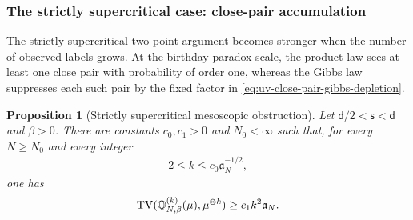 \documentclass[11pt,reqno]{amsart}
\numberwithin{equation}{section}
\theoremstyle{plain}
\newtheorem{prop}[prop]{Proposition}
\theoremstyle{remark}
\DeclarePairedDelimiter{\pa}{\lparen}{\rparen}
\renewcommand{\d}{\mathsf{d}}
\newcommand{\Q}{{\mathbb{Q}}}
\newcommand{\be}{\beta}
\newcommand{\s}{\mathsf{s}}
\newcommand{\TV}{\operatorname{TV}}
\begin{document}
\subsubsection{The strictly supercritical case: close-pair accumulation}
\label{subsubsec:uv-supercritical-mesoscopic}

The strictly supercritical two-point argument becomes stronger when the number of observed labels grows.  At the birthday-paradox scale, the product law sees at least one close pair with probability of order one, whereas the Gibbs law suppresses each such pair by the fixed factor in \eqref{eq:uv-close-pair-gibbs-depletion}.

\begin{prop}[Strictly supercritical mesoscopic obstruction]
\label{prop:uv-mesoscopic-close-pair}
Let \(\d/2<\s<\d\) and \(\be>0\).  There are constants \(c_0,c_1>0\) and \(N_0<\infty\) such that, for every \(N\ge N_0\) and every integer
\begin{align}\label{eq:uv-mesoscopic-supercritical-k-range}
 2\le k\le c_0\mathfrak a_N^{-1/2},
\end{align}
one has
\begin{align}\label{eq:uv-mesoscopic-supercritical-TV-lower}
 \TV\pa{\Q_{N,\be}^{(k)}(\mu),\mu^{\otimes k}}
 \ge c_1k^2\mathfrak a_N.
\end{align}
\end{prop}
\end{document}
